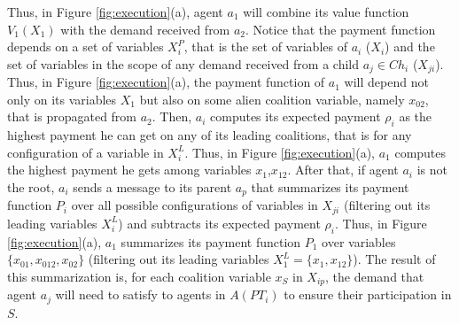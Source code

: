 \documentclass[11pt, twoside, titlepage, a4paper, openright]{report}
\begin{document}
Thus, in Figure \ref{fig:execution}(a), agent $a_1$ will combine its value
function $V_1(X_{1})$ with the demand received from $a_2$.
Notice that the payment function depends on a set of variables $X^{P}_{i}$, that
is the set of variables of $a_i$ ($X_i$) and the set of variables in the scope
of any demand received from a child $a_j\in Ch_i$ ($X_{ji}$). 
Thus, in
Figure \ref{fig:execution}(a), the payment function of $a_1$ will depend not
only on its variables $X_1$ but also on
some alien coalition variable, namely $x_{02}$, that is propagated from
$a_2$. Then,
$a_i$ computes its expected payment $\rho_i$ as the highest payment he can
get on any of its leading coalitions, that is for any configuration
of a variable in $X^{L}_i$. Thus, in Figure
\ref{fig:execution}(a), $a_1$ computes the highest payment he gets among
variables $x_{1}$,$x_{12}$.
After that, if agent $a_i$ is not the root, $a_i$ sends a message to
its parent $a_p$ that summarizes its payment function $P_i$ over all possible
configurations of variables in $X_{ji}$ (filtering out its leading variables
$X^{L}_{i}$) and subtracts its expected payment $\rho_i$.
Thus, in Figure \ref{fig:execution}(a), $a_1$ summarizes its payment function
$P_1$ over variables $\{x_{01},x_{012},x_{02}\}$ (filtering out its leading
variables $X^{L}_{1}=\{x_1,x_{12}\}$). 
The result of this summarization is, for each coalition variable $x_S$ in
$X_{ip}$, the demand that agent $a_j$ will need to satisfy to agents in
$A(PT_i)$ to ensure their participation in $S$.
\end{document}
